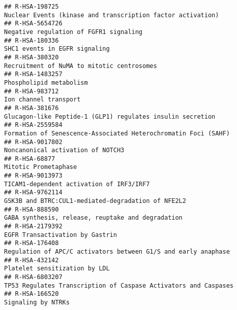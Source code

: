 \documentclass[
]{article}
\begin{document}
\begin{verbatim}
## R-HSA-198725                                                                           Nuclear Events (kinase and transcription factor activation)
## R-HSA-5654726                                                                                               Negative regulation of FGFR1 signaling
## R-HSA-180336                                                                                                         SHC1 events in EGFR signaling
## R-HSA-380320                                                                                            Recruitment of NuMA to mitotic centrosomes
## R-HSA-1483257                                                                                                              Phospholipid metabolism
## R-HSA-983712                                                                                                                 Ion channel transport
## R-HSA-381676                                                                            Glucagon-like Peptide-1 (GLP1) regulates insulin secretion
## R-HSA-2559584                                                                       Formation of Senescence-Associated Heterochromatin Foci (SAHF)
## R-HSA-9017802                                                                                                    Noncanonical activation of NOTCH3
## R-HSA-68877                                                                                                                   Mitotic Prometaphase
## R-HSA-9013973                                                                                             TICAM1-dependent activation of IRF3/IRF7
## R-HSA-9762114                                                                                   GSK3B and BTRC:CUL1-mediated-degradation of NFE2L2
## R-HSA-888590                                                                                     GABA synthesis, release, reuptake and degradation
## R-HSA-2179392                                                                                                      EGFR Transactivation by Gastrin
## R-HSA-176408                                                                        Regulation of APC/C activators between G1/S and early anaphase
## R-HSA-432142                                                                                                         Platelet sensitization by LDL
## R-HSA-6803207                                                                      TP53 Regulates Transcription of Caspase Activators and Caspases
## R-HSA-166520                                                                                                                    Signaling by NTRKs

\end{verbatim}
\end{document}
